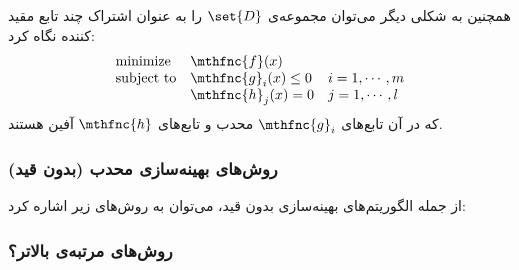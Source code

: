 همچنین به شکلی دیگر می‌توان مجموعه‌ی
$\set{D}$
را به عنوان اشتراک چند تابع مقید کننده نگاه کرد:
\[
\begin{array}{lll}
\mbox{minimize} & \mthfnc{f}( x )\\
\mbox{subject to} & \mthfnc{g}_i(x) \leq 0 & i = 1, \cdots, m\\
 & \mthfnc{h}_j(x) = 0 & j = 1, \cdots, l
\end{array}
\]
که در آن تابع‌های
$\mthfnc{g}_i$
محدب و تابع‌های
$\mthfnc{h}$
آفین هستند.


\subsubsection{
روش‌های بهینه‌سازی محدب (بدون قید)
}
از جمله الگوریتم‌های بهینه‌سازی بدون قید، می‌توان به روش‌های زیر اشاره کرد:

\subsubsection{
روش‌های مرتبه‌ی بالاتر؟
}



















































































